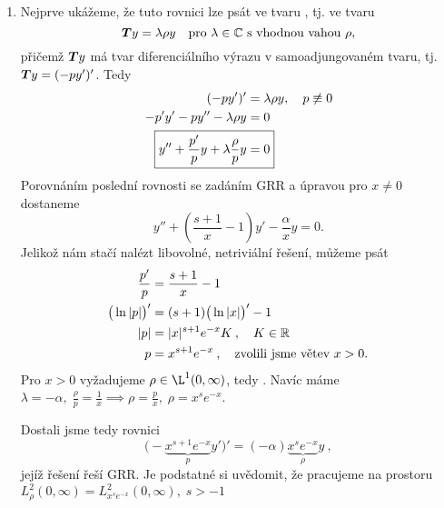 \begin{enumerate}

\item Nejprve ukážeme, že tuto rovnici lze psát ve tvaru , tj. ve tvaru 
$$\boldsymbol{T}y=\lambda\rho y\quad \text{pro }\lambda\in\mathbb{C}\text{ s vhodnou vahou }\rho,$$
přičemž $\boldsymbol{T}y$ má tvar diferenciálního výrazu v samoadjungovaném tvaru, tj. $\boldsymbol{T}y=(-py')'$. Tedy
\begin{align*}
    (-py')' &=\lambda\rho y,\quad  p \not \equiv 0\\
    -p'y'-py''-\lambda\rho y&=0\\
    \Aboxed{y''+\frac{p'}{p}y+\lambda\frac{\rho}{p}y&=0}
\end{align*}
Porovnáním poslední rovnosti se zadáním GRR a úpravou pro $x\neq0$ dostaneme
$$y''+\left(\frac{s+1}{x}-1\right)y'-\frac{\alpha}{x}y=0.$$
Jelikož nám stačí nalézt libovolné, netriviální řešení, můžeme psát
\begin{align*}
    \frac{p'}{p}&=\frac{s+1}{x}-1 \\
    \big(\ln|p|\big)' &= (s+1)\big(\ln|x|\big)'-1\\
    |p| &= |x|^{s+1}e^{-x}K\:,\quad K\in\mathbb{R}\\
    p&=x^{s+1}e^{-x}\:,\quad \text{zvolili jsme větev }x>0.
\end{align*}
Pro $x>0$ vyžadujeme $\rho\in\L^1(0,\infty)$, tedy . Navíc máme $\lambda=-\alpha,\; \frac{\rho}{p} = \frac{1}{x} \implies \rho=\frac{p}{x},\;\rho = x^se^{-x}$.

Dostali jsme tedy rovnici
\begin{equation}
    \boxed{\big(-\underbrace{x^{s+1}e^{-x}}_{p} y'\big)'=(-\alpha)\underbrace{x^se^{-x}}_{\rho}y\:,}
    \label{eq:SAT}
\end{equation}
jejíž řešení řeší GRR. Je podstatné si uvědomit, že pracujeme na prostoru $L_\rho^2(0,\infty)=L_{x^se^{-x}}^2(0,\infty),\;s>-1$


\end{enumerate}
